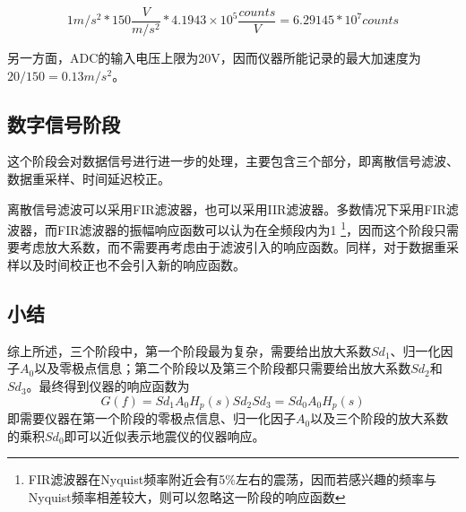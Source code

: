 \[
    1 m/s^2 * 150 \frac{V}{m/s^2} * 4.1943\times 10^5 \frac{counts}{V} = 6.29145*10^7 counts
\]

另一方面，ADC的输入电压上限为20V，因而仪器所能记录的最大加速度为$20/150=0.13 m/s^2$。

\subsection{数字信号阶段}
这个阶段会对数据信号进行进一步的处理，主要包含三个部分，即离散信号滤波、数据重采样、时间延迟校正。

离散信号滤波可以采用FIR滤波器，也可以采用IIR滤波器。多数情况下采用FIR滤波器，而FIR滤波器的振幅响应函数可以认为在全频段内为1
\footnote{FIR滤波器在Nyquist频率附近会有5\%左右的震荡，因而若感兴趣的频率与Nyquist频率相差较大，则可以忽略这一阶段的响应函数}，因而这个阶段只需要考虑放大系数，而不需要再考虑由于滤波引入的响应函数。同样，对于数据重采样以及时间校正也不会引入新的响应函数。

\subsection{小结}
综上所述，三个阶段中，第一个阶段最为复杂，需要给出放大系数$Sd_{1}$、归一化因子$A_0$以及零极点信息；第二个阶段以及第三个阶段都只需要给出放大系数$Sd_{2}$和$Sd_3$。最终得到仪器的响应函数为
\[
    G(f)=Sd_1 A_0 H_p(s) Sd_2 Sd_3=Sd_0 A_0 H_p(s)
\]
即需要仪器在第一个阶段的零极点信息、归一化因子$A_0$以及三个阶段的放大系数的乘积$Sd_0$即可以近似表示地震仪的仪器响应。
